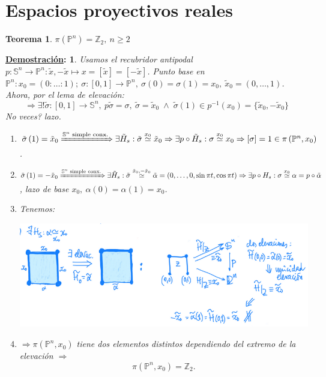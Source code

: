 \documentclass[10pt,a4paper,openright]{book}
\theoremstyle{break}
\newtheorem*{theo}{Teorema}
\newtheorem*{demo}{\underline{Demostración}:}
\begin{document}
\section{Espacios proyectivos reales}%
\label{sec:espacios_proyectivos_reales_rec}
\begin{theo}
$\pi\left( \mathbb{P}^{n} \right) = \mathbb{Z}_2,\ n \ge 2$
\end{theo}
\begin{demo}
Usamos el recubridor antipodal $p : \mathbb{S}^n \rightarrow \mathbb{P}^{n}: \tilde{x}, -\tilde{x} \mapsto x = \left[ \tilde{x} \right] = \left[ - \tilde{x} \right]$. Punto base en $\mathbb{P}^{n}: x_0 = \left( 0 : \ldots : 1 \right);\ \sigma: \left[ 0, 1 \right] \rightarrow \mathbb{P}^{n},\ \sigma\left( 0 \right) = \sigma\left( 1 \right) = x_0,\ \tilde{x}_0 = \left( 0, \ldots, 1 \right)$. Ahora, por el lema de elevación:
\[
    \Rightarrow \exists! \tilde{\sigma}: \left[ 0, 1 \right] \rightarrow \mathbb{S}^{n},\ p\tilde{\sigma} = \sigma,\ \tilde{\sigma} = \tilde{x}_0\; \land \;\tilde{\sigma}\left( 1 \right) \in p^{-1}\left( x_0 \right) = \{\tilde{x}_0, -\tilde{x}_0\}  
\]
No veces? lazo.
\begin{enumerate}
    \item $\tilde{\sigma}\left( 1 \right) = \tilde{x}_0 \xRightarrow{\mathbb{S}^{n} \text{ simple conx.}} \exists \tilde{H}_s: \tilde{\sigma} \stackrel{x_0}{\simeq} \tilde{x}_0 \Rightarrow \exists p \circ \tilde{H}_s: \sigma \stackrel{x_0}{\simeq} x_0 \Rightarrow \left[ \sigma \right] = 1 \in \pi\left( \mathbb{P}^{n}, x_0 \right)$. 

    \item $\tilde{\sigma} \left( 1 \right) = -\tilde{x}_0 \xRightarrow{\mathbb{S}^{n} \text{ simple conx.}} \exists \tilde{H}_s: \tilde{\sigma} \stackrel{\tilde{x}_0,-\tilde{x}_0}{\simeq} \tilde{\alpha} = \left( 0, \ldots, 0, \sin \pi t, \cos \pi t \right) \Rightarrow \exists p \circ H_s: \sigma \stackrel{x_0}{\simeq} \alpha = p \circ \tilde{\alpha}$, lazo de base $x_0,\ \alpha\left( 0 \right) = \alpha\left( 1 \right) = x_0$. 

    \item Tenemos:
    \begin{center}
        \includegraphics[scale=0.3]{images/rec_esp_proy_r} 
    \end{center}

    \item[1. 2. 3.] $\Rightarrow \pi\left( \mathbb{P}^{n}, x_0 \right)$ tiene dos elementos distintos dependiendo del extremo de la elevación $\Rightarrow$ 
        \[
        \boxed{\pi\left( \mathbb{P}^{n}, x_0 \right) = \mathbb{Z}_2}.
        \]
\end{enumerate}
\end{demo}
\end{document}
